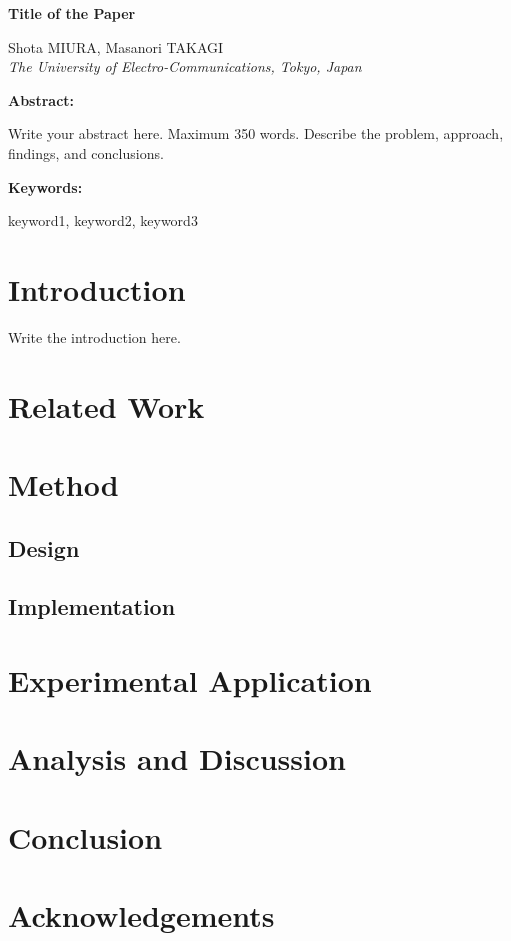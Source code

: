 \documentclass[11pt,a4paper]{article}
\newcommand{\iccetitle}[1]{%
  \begin{center}
    {\fontsize{22pt}{26pt}\selectfont\bfseries #1}%
  \end{center}%
  \vspace{\baselineskip}%
}
\newcommand{\icceauthor}[2]{%
  \begin{center}
    #1 \\ {\itshape #2}%
  \end{center}%
}
\newenvironment{icceabstract}{%
  \begin{list}{}{%
    \setlength{\leftmargin}{0.5in}%
    \setlength{\rightmargin}{0.5in}%
  }%
  \item[]\small\noindent\textbf{Abstract:}\space
}{%
  \end{list}%
}
\newenvironment{iccekeywords}{%
  \vspace{\baselineskip}%
  \begin{list}{}{%
    \setlength{\leftmargin}{0.5in}%
    \setlength{\rightmargin}{0.5in}%
  }%
  \item[]\small\noindent\textbf{Keywords:}\space
}{%
  \end{list}%
  \vspace{2\baselineskip}%
}
\begin{document}
\vspace{\baselineskip}

\iccetitle{Title of the Paper}

\icceauthor{Shota MIURA, Masanori TAKAGI}%
  {The University of Electro-Communications, Tokyo, Japan}

\vspace{\baselineskip}

\begin{icceabstract}
  Write your abstract here. Maximum 350 words.
  Describe the problem, approach, findings, and conclusions.
\end{icceabstract}

\begin{iccekeywords}
  keyword1, keyword2, keyword3
\end{iccekeywords}


\section{Introduction}

Write the introduction here.

\section{Related Work}

\section{Method}

\subsection{Design}

\subsection{Implementation}

\section{Experimental Application}

\section{Analysis and Discussion}

\section{Conclusion}

\section*{Acknowledgements}

\printbibliography[title={References}]
\end{document}
